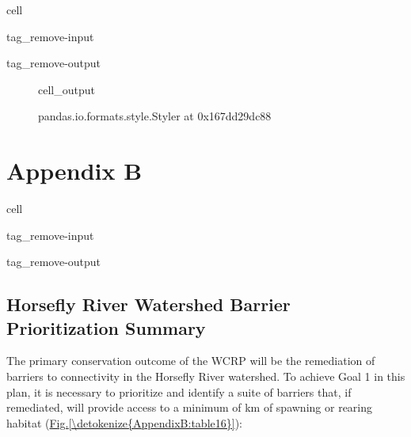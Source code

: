 \documentclass[letterpaper,10pt,english]{jupyterBook}
\begin{document}
\begin{sphinxuseclass}{cell}
\begin{sphinxuseclass}{tag_remove-input}
\begin{sphinxuseclass}{tag_remove-output}
\end{sphinxuseclass}
\end{sphinxuseclass}
\end{sphinxuseclass}
\begin{figure}[htbp]
\centering
\capstart
\begin{sphinxVerbatimOutput}

\begin{sphinxuseclass}{cell_output}
\begin{sphinxVerbatim}[commandchars=\\\{\}]
\PYGZlt{}pandas.io.formats.style.Styler at 0x167dd29dc88\PYGZgt{}
\end{sphinxVerbatim}

\end{sphinxuseclass}\end{sphinxVerbatimOutput}
\caption{}\label{\detokenize{AppendixA:table15}}\end{figure}

\sphinxstepscope


\chapter{Appendix B}
\label{\detokenize{AppendixB:appendix-b}}\label{\detokenize{AppendixB::doc}}
\begin{sphinxuseclass}{cell}
\begin{sphinxuseclass}{tag_remove-input}
\begin{sphinxuseclass}{tag_remove-output}
\end{sphinxuseclass}
\end{sphinxuseclass}
\end{sphinxuseclass}

\section{Horsefly River Watershed Barrier Prioritization Summary}
\label{\detokenize{AppendixB:horsefly-river-watershed-barrier-prioritization-summary}}
\sphinxAtStartPar
The primary conservation outcome of the WCRP will be the remediation of barriers to connectivity in the Horsefly River watershed. To achieve Goal 1 in this plan, it is necessary to prioritize and identify a suite of barriers that, if remediated, will provide access to a minimum of  km of spawning or rearing habitat (\hyperref[\detokenize{AppendixB:table16}]{Fig.\@ \ref{\detokenize{AppendixB:table16}}}):
\end{document}
